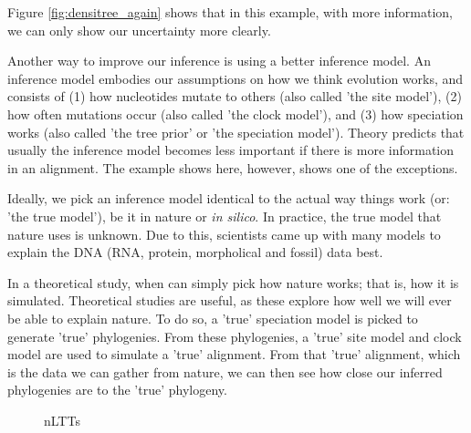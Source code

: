 Figure \ref{fig:densitree_again} shows that in this example,
with more information, we can only show our uncertainty more clearly. 

Another way to improve our inference is using a better inference model.
An inference model embodies our assumptions on how we think evolution
works, and consists of (1) how nucleotides mutate to others (also
called 'the site model'), (2) how often mutations occur (also 
called 'the clock model'), and (3) how speciation works (also 
called 'the tree prior' or 'the speciation model'). 
Theory predicts that usually the inference model becomes less important
if there is more information in an alignment. The example shows here,
however, shows one of the exceptions.

Ideally, we pick an inference model identical to the actual way things 
work (or: 'the true model'), be it in nature
or \textit{in silico}. In practice, the true model that nature uses is unknown.
Due to this, scientists came up with many models to explain the 
DNA (RNA, protein, morpholical and fossil) data best.

In a theoretical study, when can simply pick how nature works; that is,
how it is simulated. Theoretical studies are useful, as these explore
how well we will ever be able to explain nature. To do so, a 'true' 
speciation model is picked to generate 'true' phylogenies. 
From these phylogenies, a 'true' site model and clock model are used to
simulate a 'true' alignment. From that 'true' alignment, which is the
data we can gather from nature, we can then see how close our inferred
phylogenies are to the 'true' phylogeny.

\begin{figure}[H]
  \centering
  \caption{
    nLTTs
  }
  \label{fig:nltts}
\end{figure}

